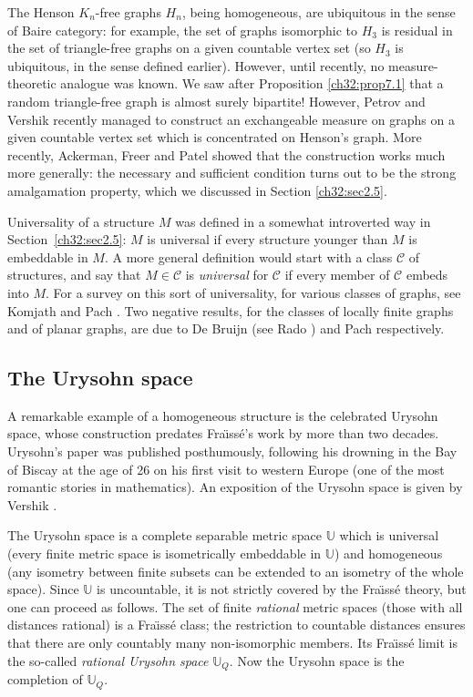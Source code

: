 \documentclass{book}
\begin{document}
The Henson $K_n$-free graphs $H_n$, being homogeneous, are ubiquitous in the 
sense of Baire category: for example, the set of graphs isomorphic to $H_3$
is residual in the set of triangle-free graphs on a given countable vertex
set (so $H_3$ is ubiquitous, in the sense defined earlier). However, until
recently, no measure-theoretic analogue was known. We saw after Proposition
\ref{ch32:prop7.1} that a random triangle-free graph is almost surely
bipartite! However, Petrov and Vershik \cite{ch32:new13} recently
managed to construct
an exchangeable measure on graphs on a given countable vertex set which is
concentrated on Henson's graph. More recently, Ackerman, Freer and Patel
showed that the construction works much more generally: the necessary and
sufficient condition turns out to be the strong amalgamation property, which
we discussed in Section \ref{ch32:sec2.5}.

Universality of a structure $M$ was defined in a somewhat
introverted way in Section~\ref{ch32:sec2.5}: $M$ is universal if
every structure younger than $M$ is embeddable in $M$. A more
general definition would start with a class $\mathcal{C}$ of
structures, and say that $M \in \mathcal{C}$ is \emph{universal}
for $\mathcal{C}$ if every member of $\mathcal{C}$ embeds into $M$.
For a survey on this sort of universality, for
various classes of graphs, see Komjath and Pach \cite{ch32:bib33}.
Two negative results, for the classes of locally finite graphs and
of planar graphs, are due to De Bruijn (see Rado \cite{ch32:bib42})
and Pach \cite{ch32:bib40} respectively.

\subsection{The Urysohn space}

A remarkable example of a homogeneous structure is the celebrated
Urysohn space, whose construction predates Fra\"{\i}ss\'e's work by
more than two decades. Urysohn's paper \cite{ch32:new16} was published
posthumously, following his drowning in the Bay of Biscay at the age of
26 on his first visit to western Europe (one of the most romantic stories
in mathematics). An exposition of the Urysohn space is given by 
Vershik \cite{ch32:new17}.

The Urysohn space is a complete separable metric space $\mathbb{U}$ which
is universal (every finite metric space is isometrically embeddable in
$\mathbb{U}$) and homogeneous (any isometry between finite subsets can be
extended to an isometry of the whole space). Since $\mathbb{U}$ is
uncountable, it is not strictly covered by the Fra\"{\i}ss\'e theory, but
one can proceed as follows. The set of finite \emph{rational} metric
spaces (those with all distances rational) is a Fra\"{\i}ss\'e class;
the restriction to countable distances ensures that there are only countably
many non-isomorphic members. Its Fra\"{\i}ss\'e limit is the so-called
\emph{rational Urysohn space} $\mathbb{U}_Q$. Now the Urysohn space is the
completion of $\mathbb{U}_Q$.
\end{document}
